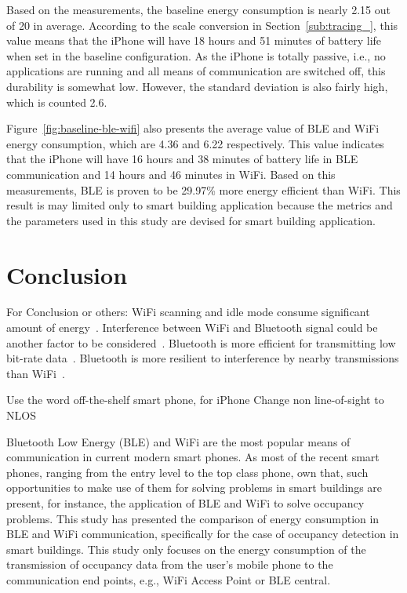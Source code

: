 \documentclass[journal]{vgtc}                %
\begin{document}
Based on the measurements, the baseline energy consumption is nearly 2.15 out of 20 in average. According to the scale conversion in Section~\ref{sub:tracing_}, this value means that the iPhone will have 18 hours and 51 minutes of battery life when set in the baseline configuration. As the iPhone is totally passive, i.e., no applications are running and all means of communication are switched off, this durability is somewhat low. However, the standard deviation is also fairly high, which is counted 2.6.

Figure~\ref{fig:baseline-ble-wifi} also presents the average value of BLE and WiFi energy consumption, which are 4.36 and 6.22 respectively. This value indicates that the iPhone will have 16 hours and 38 minutes of battery life in BLE communication and 14 hours and 46 minutes in WiFi. Based on this measurements, BLE is proven to be 29.97\% more energy efficient than WiFi. This result is may limited only to smart building application because the metrics and the parameters used in this study are devised for smart building application.



\section{Conclusion} %
\label{sec:conclusion}

For Conclusion or others:
WiFi scanning and idle mode consume significant amount of energy~\cite{Bandara2015}.
Interference between WiFi and Bluetooth signal could be another factor to be considered~\cite{Lin2013}.
Bluetooth is more efficient for transmitting low bit-rate data~\cite{Friedman2013}.
Bluetooth is more resilient to interference by nearby transmissions than WiFi~\cite{Friedman2011}.

Use the word off-the-shelf smart phone, for iPhone
Change non line-of-sight to NLOS


Bluetooth Low Energy (BLE) and WiFi are the most popular means of communication in current modern smart phones. As most of the recent smart phones, ranging from the entry level to the top class phone, own that, such opportunities to make use of them for solving problems in smart buildings are present, for instance, the application of BLE and WiFi to solve occupancy problems. This study has presented the comparison of energy consumption in BLE and WiFi communication, specifically for the case of occupancy detection in smart buildings. This study only focuses on the energy consumption of the transmission of occupancy data from the user's mobile phone to the communication end points, e.g., WiFi Access Point or BLE central.
\end{document}
